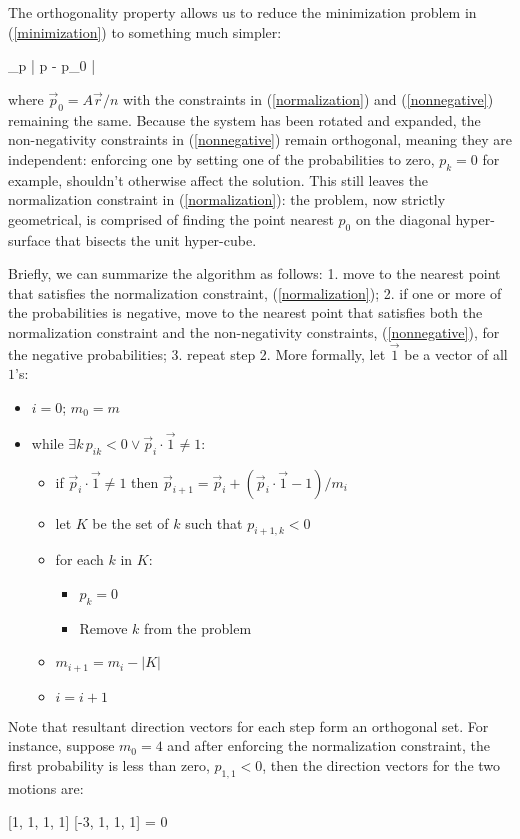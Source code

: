 The orthogonality property allows us to reduce the minimization problem 
in (\ref{minimization}) to something much simpler:
\begin{eqnnon}
	\arg \min_{\vec p} | \vec p - \vec p_0 |
\end{eqnnon}
where $\vec p_0 = A \vec r/n$ with the constraints in (\ref{normalization}) and
(\ref{nonnegative}) remaining the same.
Because the system has been rotated and expanded, the non-negativity 
constraints in (\ref{nonnegative}) remain orthogonal, meaning they are 
independent: enforcing one by setting one of the probabilities to zero, 
$p_k=0$ for example, shouldn't otherwise affect the solution.
This still leaves the normalization constraint in (\ref{normalization}):
the problem, now strictly geometrical, is comprised of finding the point nearest $p_0$ on the diagonal hyper-surface that bisects the unit hyper-cube.

Briefly, we can summarize the algorithm as follows:
1. move to the nearest point that satisfies the normalization constraint,
(\ref{normalization}); 2. if one or more of the probabilities is negative,
move to the nearest point that satisfies both 
the normalization constraint
and the non-negativity constraints, (\ref{nonnegative}), for the negative probabilities;
3. repeat step 2.
More formally, let $\vec 1$ be a vector of all $1$'s:
\begin{itemize}
	\item $i=0$; $m_0=m$
	\item while $\exists k \, p_{ik} < 0 \lor \vec p_i \cdot \vec 1 \ne 1$:
	\begin{itemize}
		\item if $\vec p_i \cdot \vec 1 \ne 1$ then 
		$\vec p_{i+1} = \vec p_i + (\vec p_i \cdot \vec 1 - 1)/m_i$
		\item let $K$ be the set of $k$ such that $p_{i+1,k} < 0$
		\item for each $k$ in $K$:
		\begin{itemize}
			\item $p_k=0$
			\item Remove $k$ from the problem
		\end{itemize}
		\item $m_{i+1}=m_i-|K|$
		\item $i=i+1$
	\end{itemize}
\end{itemize}

Note that resultant direction vectors for each step form an orthogonal set.
For instance, suppose $m_0=4$ and after enforcing the normalization constraint,
the first probability is less than zero, $p_{1,1} < 0$,
then the direction vectors for the two motions are:
\begin{eqnnon}
	[1, 1, 1, 1] \cdot {} [-3, 1, 1, 1] = 0
\end{eqnnon}

